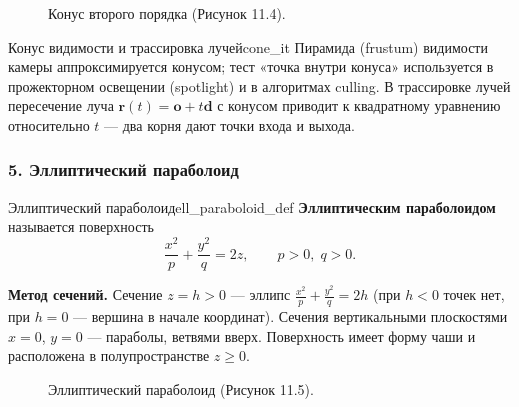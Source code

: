 \documentclass[12pt,a4paper]{article}
\begin{document}
\begin{figure}[h!]
  \centering
  \caption{Конус второго порядка (Рисунок 11.4).}
  \label{fig:cone}
\end{figure}

\begin{remarkIT}{Конус видимости и трассировка лучей}{cone_it}
  Пирамида (frustum) видимости камеры аппроксимируется конусом;
  тест «точка внутри конуса» используется в прожекторном освещении
  (spotlight) и в алгоритмах culling. В трассировке лучей пересечение
  луча $\mathbf{r}(t) = \mathbf{o} + t\mathbf{d}$ с конусом приводит к
  квадратному уравнению относительно $t$ — два корня дают точки входа
  и выхода.
\end{remarkIT}

\subsubsection*{5. Эллиптический параболоид}

\begin{definition}{Эллиптический параболоид}{ell_paraboloid_def}
  \textbf{Эллиптическим параболоидом} называется поверхность
  \begin{equation}
    \frac{x^2}{p} + \frac{y^2}{q} = 2z, \qquad p > 0,\; q > 0. \tag{11.8}
  \end{equation}

  \textbf{Метод сечений.} Сечение $z = h > 0$ — эллипс
  $\frac{x^2}{p} + \frac{y^2}{q} = 2h$ (при $h < 0$ точек нет, при
  $h = 0$ — вершина в начале координат). Сечения вертикальными
  плоскостями $x = 0$, $y = 0$ — параболы, ветвями вверх. Поверхность
  имеет форму чаши и расположена в полупространстве $z \ge 0$.
\end{definition}

\begin{figure}[h!]
  \centering
  \caption{Эллиптический параболоид (Рисунок 11.5).}
  \label{fig:ell_paraboloid}
\end{figure}
\end{document}
